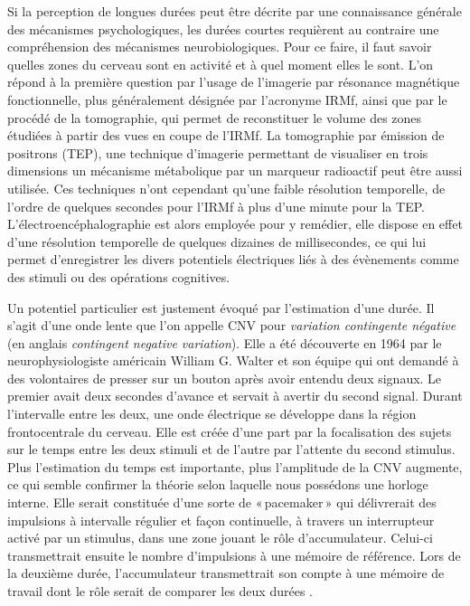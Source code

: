 \documentclass[12pt,fleqn,oneside,french,openany]{book} %
\begin{document}
Si la perception de longues durées peut être décrite par une connaissance générale des mécanismes psychologiques, les durées courtes requièrent au contraire une compréhension des mécanismes neurobiologiques. Pour ce faire, il faut savoir quelles zones du cerveau sont en activité et à quel moment elles le sont. L'on répond à la première question par l'usage de l'imagerie par résonance magnétique fonctionnelle, plus généralement désignée par l'acronyme IRMf, ainsi que par le procédé de la tomographie, qui permet de reconstituer le volume des zones étudiées à partir des vues en coupe de l'IRMf. La tomographie par émission de positrons (TEP), une technique d'imagerie permettant de visualiser en trois dimensions un mécanisme métabolique par un marqueur radioactif peut être aussi utilisée. Ces techniques n'ont cependant qu'une faible résolution temporelle, de l'ordre de quelques secondes pour l'IRMf à plus d'une minute pour la TEP. L'électroencéphalographie est alors employée pour y remédier, elle dispose en effet d'une résolution temporelle de quelques dizaines de millisecondes, ce qui lui permet d'enregistrer les divers potentiels électriques liés à des évènements comme des stimuli ou des opérations cognitives. 

\begin{figure}[h]
\end{figure}

Un potentiel particulier est justement évoqué par l'estimation d'une durée. Il s'agit d'une onde lente que l'on appelle CNV pour \emph{variation contingente négative} (en anglais \emph{contingent negative variation}). Elle a été découverte en 1964 par le neurophysiologiste américain William G. Walter et son équipe qui ont demandé à des volontaires de presser sur un bouton après avoir entendu deux signaux. Le premier avait deux secondes d'avance et servait à avertir du second signal. Durant l'intervalle entre les deux, une onde électrique se développe dans la région frontocentrale du cerveau. Elle est créée d'une part par la focalisation des sujets sur le temps entre les deux stimuli et de l'autre par l'attente du second stimulus. Plus l'estimation du temps est importante, plus l'amplitude de la CNV augmente, ce qui semble confirmer la théorie selon laquelle nous possédons une horloge interne. Elle serait constituée d'une sorte de «\,pacemaker\,» qui délivrerait des impulsions à intervalle régulier et façon continuelle, à travers un interrupteur activé par un stimulus, dans une zone jouant le rôle d'accumulateur. Celui-ci transmettrait ensuite le nombre d'impulsions à une mémoire de référence. Lors de la deuxième durée, l'accumulateur transmettrait son compte à une mémoire de travail dont le rôle serait de comparer les deux durées \cite{gibbon1984}.
\end{document}
